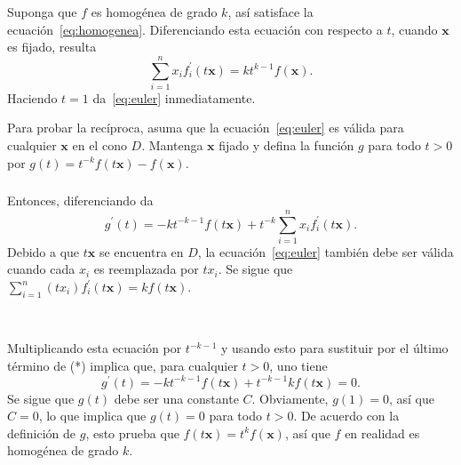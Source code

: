 \begin{frame}[t]
\frametitle{\subsecname}

\begin{proofs}
Suponga que $f$ es homogénea de grado $k$, así satisface la ecuación~\eqref{eq:homogenea}. Diferenciando esta ecuación con respecto a $t$, cuando $\bm{x}$ es fijado, resulta \[ \sum_{i=1}^{n}x_{i}f^{\prime}_{i}\left(t\bm{x}\right)=kt^{k-1}f\left(\bm{x}\right). \] Haciendo $t=1$ da~\eqref{eq:euler} inmediatamente.

Para probar la recíproca, asuma que la ecuación~\eqref{eq:euler} es válida para cualquier $\bm{x}$ en el cono $D$. Mantenga $\bm{x}$ fijado y defina la función $g$ para todo $t>0$ por $g\left(t\right)=t^{-k}f\left(t\bm{x}\right)-f\left(\bm{x}\right)$.
\end{proofs}

\end{frame}
\begin{frame}[t]
\frametitle{\subsecname}
\begin{proofs}
 Entonces, diferenciando da
\begin{equation}
g^{\prime}\left(t\right)=-kt^{-k-1}f\left(t\bm{x}\right)+t^{-k}\sum_{i=1}^{n}x_{i}f^{\prime}_{i}\left(t\bm{x}\right).
\end{equation}
Debido a que $t\bm{x}$ se encuentra en $D$, la ecuación~\eqref{eq:euler} también debe ser válida cuando cada $x_{i}$ es reemplazada por $tx_{i}$. Se sigue que $\sum_{i=1}^{n}\left(tx_{i}\right)f^{\prime}_{i}\left(t\bm{x}\right)=kf\left(t\bm{x}\right)$.

\

Multiplicando esta ecuación por $t^{-k-1}$ y usando esto para sustituir por el último término de (*) implica que, para cualquier $t>0$, uno tiene \[ g^{\prime}\left(t\right)=-kt^{-k-1}f\left(t\bm{x}\right)+t^{-k-1}kf\left(t\bm{x}\right)=0. \] Se sigue que $g\left(t\right)$ debe ser una constante $C$. Obviamente, $g\left(1\right)=0$, así que $C=0$, lo que implica que $g\left(t\right)=0$ para todo $t>0$. De acuerdo con la definición de $g$, esto prueba que $f\left(t\bm{x}\right)=t^{k}f\left(\bm{x}\right)$, así que $f$ en realidad es homogénea de grado $k$.
\end{proofs}
\end{frame}

